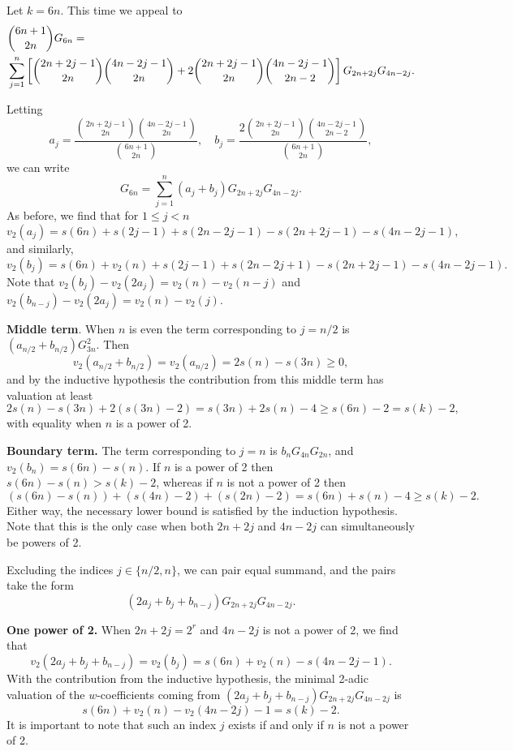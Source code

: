 \documentclass[12pt]{amsart}
\begin{document}
Let $k = 6n$. This time we appeal to \cite[Theorem 2]{MerRol}
\begin{align*}
& \binom{6n+1}{2n} G_{6n}  = \notag \\ & \sum_{j=1}^n \left[ \binom{2n+2j-1}{2n}\binom{4n-2j-1}{2n} + 2\binom{2n+2j-1}{2n}\binom{4n-2j-1}{2n-2} \right] G_{2n+2j} G_{4n-2j}. 
\end{align*}


Letting $$a_j = \frac{\binom{2n+2j-1}{2n}\binom{4n-2j-1}{2n}}{\binom{6n+1}{2n}}, \quad b_j = \frac{2\binom{2n+2j-1}{2n}\binom{4n-2j-1}{2n-2}}{\binom{6n+1}{2n}},$$we can write$$G_{6n} = \sum_{j=1}^n (a_j + b_j) G_{2n+2j}G_{4n-2j}.$$ As before, we find that for $1\le j <n$
\[v_2(a_j)=s(6n) + s(2j-1) + s(2n-2j-1) - s(2n+2j-1) - s(4n-2j-1),\]and similarly, \[ v_2(b_j)=s(6n) + v_2(n) + s(2j-1) + s(2n-2j+1) - s(2n+2j-1) - s(4n-2j-1).\] Note that $v_2(b_j)-v_2(2a_j)=v_2(n)-v_2(n-j)$ and $v_2(b_{n-j})-v_2(2a_j)=v_2(n)-v_2(j).$ 

\bigskip

\noindent \textbf{Middle term}. When $n$ is even the term corresponding to $j=n/2$ is $(a_{n/2}+b_{n/2})G_{3n}^2$. Then \[v_2(a_{n/2}+b_{n/2})=v_2(a_{n/2})=2s(n)-s(3n)\ge 0,\] and by the inductive hypothesis the contribution from this middle term has valuation at least 
\[ 2s(n)-s(3n)+2(s(3n)-2)=s(3n)+2s(n)-4\ge s(6n)-2=s(k)-2,\] with equality when $n$ is a power of 2. 

\bigskip

\noindent \textbf{Boundary term.} The term corresponding to $j=n$ is $b_nG_{4n}G_{2n}$, and $v_2(b_n)=s(6n)-s(n)$. If $n$ is a power of 2 then $s(6n)-s(n)>s(k)-2$, whereas if $n$ is not a power of 2 then \[(s(6n)-s(n))+(s(4n)-2)+(s(2n)-2)=s(6n)+s(n)-4\ge s(k)-2.\] Either way, the necessary lower bound is satisfied by the induction hypothesis. Note that this is the only case when both $2n+2j$ and $4n-2j$ can simultaneously be powers of 2. 

\bigskip

\noindent Excluding the indices $j\in \{n/2,n\}$, we can pair equal summand, and the pairs take the form \[ \left( 2a_j + b_j + b_{n-j} \right) G_{2n+2j} G_{4n-2j}.\] 

\noindent \textbf{One power of 2.} When $2n+2j=2^r$ and $4n-2j$ is not a power of 2, we find that \[ v_2(2a_j + b_j + b_{n-j})=v_2(b_j)=s(6n)+v_2(n)-s(4n-2j-1).\] With the contribution from the inductive hypothesis, the minimal 2-adic valuation of the $w$-coefficients coming from $(2a_j + b_j + b_{n-j}) G_{2n+2j} G_{4n-2j}$ is
\[s(6n)+v_2(n)-v_2(4n-2j)-1=s(k)-2.\] It is important to note that such an index $j$ exists if and only if $n$ is not a power of 2. 
\end{document}
